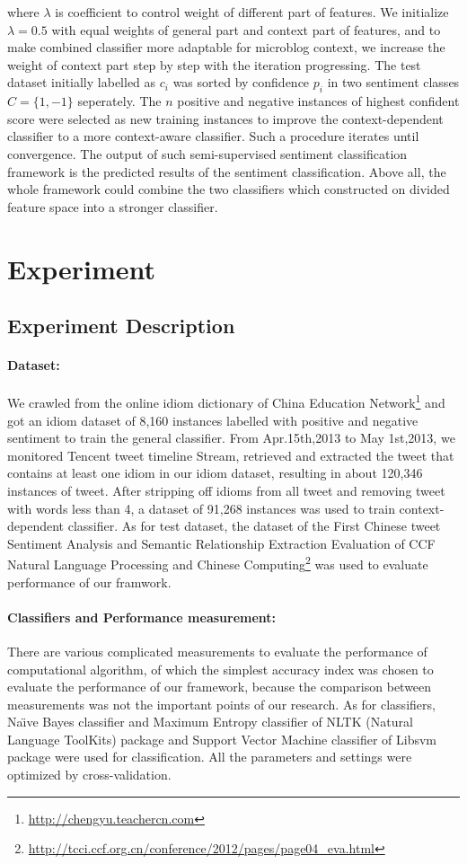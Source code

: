 \documentclass{llncs}
\begin{document}
where $ \lambda $ is coefficient to control weight of different part of features. 
We initialize $ \lambda = 0.5 $ with equal weights of general part and context part of features, and to make combined classifier more adaptable for microblog context,  we  increase the weight of context part step by step with the iteration progressing.
The test dataset initially labelled as $ c_{i} $ was sorted by confidence $ p_{i} $ in two sentiment classes $ C=\lbrace 1,-1\rbrace $ seperately.
The $ n $  positive and negative instances of highest confident score were selected as new training instances to  improve the context-dependent classifier to a more context-aware classifier. 
Such a procedure iterates until convergence.
The output of such semi-supervised sentiment classification framework is the predicted results of the sentiment classification. 
Above all, the whole framework could combine the two classifiers which constructed on divided feature space into a stronger classifier. 
\section{Experiment}
\subsection{Experiment Description}
\paragraph{Dataset:}
We crawled from the online idiom dictionary of China Education
Network\footnote{\url{http://chengyu.teachercn.com}} and got an idiom dataset of 8,160 instances labelled with positive and negative sentiment to train the general classifier. 
From Apr.15th,2013 to May 1st,2013, we monitored Tencent tweet timeline Stream, retrieved and extracted the tweet that contains at least one idiom in our idiom dataset, resulting in about 120,346 instances of tweet. 
After stripping off idioms from all tweet and removing tweet with words less than 4, a dataset of 91,268 instances was used to train context-dependent classifier. 
As for test dataset, the dataset of the First Chinese tweet Sentiment Analysis and Semantic Relationship Extraction Evaluation of CCF Natural Language Processing and Chinese Computing\footnote{\url{http://tcci.ccf.org.cn/conference/2012/pages/page04_eva.html}} was used to evaluate performance of our framwork.
\paragraph{Classifiers and Performance measurement:}
There are various complicated measurements to evaluate the performance of computational algorithm, of which the simplest accuracy index was chosen to evaluate the performance of our framework, because the comparison between measurements was not the important points of our research. 
As for classifiers, Na\"\i ve Bayes classifier and Maximum Entropy classifier of NLTK (Natural Language ToolKits)\cite{xsongx:b27} package and Support Vector Machine classifier of Libsvm\cite{xsongx:b28} package were used for classification. 
All the parameters and settings were optimized by cross-validation.
\end{document}
